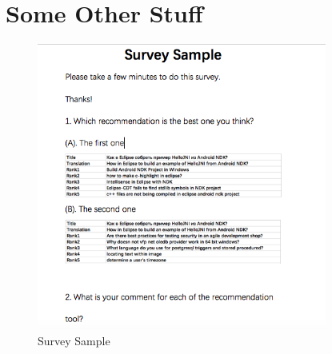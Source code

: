 
\appendix

\chapter{Some Other Stuff}
\label{app:app1}

\begin{figure}[!h]
		\centering
		\includegraphics[width = 0.85\textwidth]{figures/survey}
		\caption{Survey Sample}
	\end{figure}
